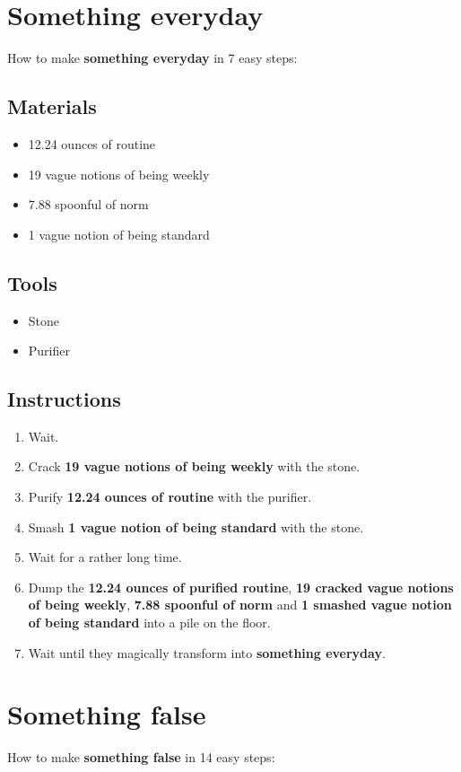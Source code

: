 \documentclass{article}
\begin{document}
\section{Something everyday}How to make \textbf{something everyday} in 7 easy steps:

\subsection{Materials}\begin{itemize}
\item 
12.24 ounces of routine
\item 
19 vague notions of being weekly
\item 
7.88 spoonful of norm
\item 
1 vague notion of being standard
\end{itemize}
\subsection{Tools}\begin{itemize}
\item 
Stone
\item 
Purifier
\end{itemize}
\subsection{Instructions}\begin{enumerate}
\item 
Wait.
\item 
Crack \textbf{19 vague notions of being weekly} with the stone.
\item 
Purify \textbf{12.24 ounces of routine} with the purifier.
\item 
Smash \textbf{1 vague notion of being standard} with the stone.
\item 
Wait for a rather long time.
\item 
Dump the \textbf{12.24 ounces of purified routine}, \textbf{19 cracked vague notions of being weekly}, \textbf{7.88 spoonful of norm} and \textbf{1 smashed vague notion of being standard} into a pile on the floor.
\item 
Wait until they magically transform into \textbf{something everyday}.
\end{enumerate}
\newpage
\section{Something false}How to make \textbf{something false} in 14 easy steps:
\end{document}
